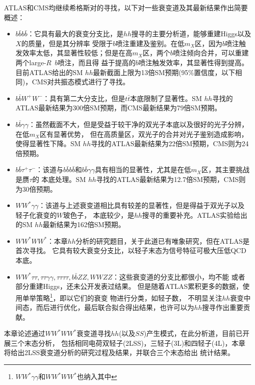 \RunTwo ATLAS和CMS均继续希格斯对的寻找，以下对一些衰变道及其最新结果作出简要概述：
\begin{itemize}
 \item $b\bar{b}b\bar{b}$：它具有最大的衰变分支比，是$hh$搜寻的主要分析道，能够重建Higgs以及$X$的质量，但是其分辨率
受限于$b$喷注重建及鉴别。在低$m_X$区，因为$b$喷注触发效率太低，其显著性较低；但是在高$m_X$区，两个$b$喷注倾向合并，可以重建两个large-$R$~$b$喷注，而且得
益于提高的$b$喷注触发效率，其显著性得到提高。目前ATLAS给出的SM $hh$最新截面上限为13倍SM预期\cite{Aaboud:2018knk}(95\%置信度，以下相同)，CMS对共振态模式进行了寻找\cite{Sirunyan:2018zkk}。
 \item $b\bar{b}W^{+}W^{-}$：具有第二大分支比，但是$t\bar{t}$本底限制了显著性。SM $hh$寻找的ATLAS最新结果为300倍SM预期\cite{Aaboud:2018zhh}，而CMS最新结果为79倍SM预期\cite{Sirunyan:2017guj}。
 \item $b\bar{b}\gamma\gamma$：虽然截面不大，但是受益于较干净的双光子本底以及很好的光子分辨，在低$m_X$区有显著优势，
 但在高质量区，双光子的合并对光子鉴别造成影响，使得显著性下降。SM $hh$寻找的ATLAS最新结果为22倍SM预期\cite{Aaboud:2018ftw}，CMS则为24倍预期\cite{Sirunyan:2018iwt}。
 \item $b\bar{b}\tau^{+}\tau^{-}$：该道与$b\bar{b}b\bar{b}$和$b\bar{b}\gamma\gamma$具有相当的显著性，尤其是在低$m_X$区，其主要挑战是赝$\tau$的
本底处理。SM $hh$寻找的ATLAS最新结果为12.7倍SM预期\cite{Aaboud:2018sfw}，CMS则为30倍预期\cite{Sirunyan:2017djm}。
 \item $WW^{*}\gamma\gamma$：该道与上述衰变道相比具有较差的显著性，但是得益于双光子以及轻子化衰变的$W$玻色子，
本底较少，是$hh$搜寻的重要补充。ATLAS实验给出的SM $hh$最新结果为162倍SM预期\cite{Aaboud:2018ewm}。
 \item $WW^{*}WW^{*}$：本章$hh$分析的研究题目，关于此道已有唯象研究\cite{4WTheory}，但在ATLAS是首次寻找。
它具有较大衰变分支比，以轻子末态为信号特征可极大压低QCD本底。
 \item $WW^{*}\tau\tau, \tau\tau\gamma\gamma, \tau\tau\tau\tau, b\bar{b}ZZ, WWZZ$：这些衰变道的分支比都很小，均不能
或者部分重建Higgs，还未公开发表过结果。
 但是随着ATLAS累积更多的数据，使用单举策略\footnote{$WW^{*}\gamma\gamma$和$WW^{*}WW^{*}$也纳入其中}，即以它们的衰变
物进行分类，如轻子数，
 不明显关注$hh$衰变中间态，而后进行优化，最后联合拟合得出结果，也许可以为$hh$搜寻作出重要贡献。
\end{itemize}

本章论述通过$WW^{*}WW^{*}$衰变道寻找$hh$(以及$SS$)产生模式，在此分析道，目前已开展三个末态分析，
包括相同电荷双轻子(2LSS)，三轻子(3L)和四轻子(4L)，本章将给出2LSS衰变道分析的研究过程及结果，并联合三个末态给出
统计结果。
